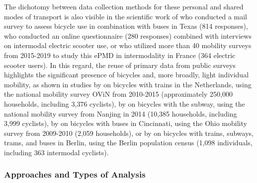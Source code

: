\begin{refsegment}
The dichotomy between data collection methods for these personal and shared modes of transport is also visible in the scientific work of \textcolor{blue}{\textcite[87]{taylor_analysis_1996}} who conducted a mail survey to assess bicycle use in combination with buses in Texas (814 responses), \textcolor{blue}{\textcite[10]{pages_nouveaux_2021}} who conducted an online questionnaire (280 responses) combined with interviews on intermodal electric scooter use, or \textcolor{blue}{\textcite[60]{rabaud_quand_2022}} who utilized more than 40 mobility surveys from 2015-2019 to study this \acrfull{ePMD} in intermodality in France (364 electric scooter users). In this regard, the reuse of primary data from public surveys highlights the significant presence of bicycles and, more broadly, light individual mobility, as shown in studies by \textcolor{blue}{\textcite[8-10]{shelat_analysing_2018}} on bicycles with trains in the Netherlands, using the national mobility survey \acrfull{OViN} from 2010-2015 (approximately 250,000 households, including 3,376 cyclists), by \textcolor{blue}{\textcite[9]{luan_better_2020}} on bicycles with the subway, using the national mobility survey from Nanjing in 2014 (10,385 households, including 3,999 cyclists), by \textcolor{blue}{\textcite[3]{zuo_determining_2018}} on bicycles with buses in Cincinnati, using the Ohio mobility survey from 2009-2010 (2,059 households), or by \textcolor{blue}{\textcite[76]{oostendorp_combining_2018}} on bicycles with trains, subways, trams, and buses in Berlin, using the Berlin population census (1,098 individuals, including 363 intermodal cyclists).%

\subsubsection*{Approaches and Types of Analysis
    \label{chap2:demarches-types-analyses}
    }


\end{refsegment}
